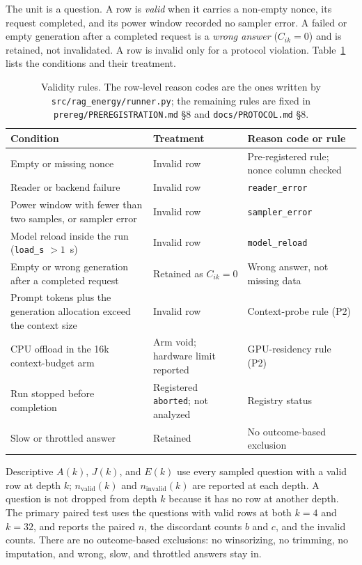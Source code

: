 \documentclass[a4paper,fleqn]{cas-sc}
\begin{document}
The unit is a question. A row is \emph{valid} when it carries a non-empty nonce, its request
completed, and its power window recorded no sampler error. A failed or empty generation after a
completed request is a \emph{wrong answer} ($C_{ik}=0$) and is retained, not invalidated. A row
is invalid only for a protocol violation. Table~\ref{tab:validity} lists the conditions and their
treatment.

\begin{table}[pos=htbp]
  \centering
  \caption{Validity rules. The row-level reason codes are the ones written by
  \texttt{src/rag\_energy/runner.py}; the remaining rules are fixed in
  \texttt{prereg/PREREGISTRATION.md} \S8 and \texttt{docs/PROTOCOL.md} \S8.}
  \label{tab:validity}
  \small
  \begin{tabularx}{\textwidth}{>{\raggedright\arraybackslash}p{4.4cm}>{\raggedright\arraybackslash}p{2.6cm}>{\raggedright\arraybackslash}X}
    \toprule
    \textbf{Condition} & \textbf{Treatment} & \textbf{Reason code or rule} \\
    \midrule
    Empty or missing nonce & Invalid row & Pre-registered rule; nonce column checked \\
    Reader or backend failure & Invalid row & \texttt{reader\_error} \\
    Power window with fewer than two samples, or sampler error & Invalid row & \texttt{sampler\_error} \\
    Model reload inside the run (\texttt{load\_s} $>1$~s) & Invalid row & \texttt{model\_reload} \\
    Empty or wrong generation after a completed request & Retained as $C_{ik}=0$ & Wrong answer, not missing data \\
    Prompt tokens plus the generation allocation exceed the context size & Invalid row & Context-probe rule (P2) \\
    CPU offload in the 16k context-budget arm & Arm void; hardware limit reported & GPU-residency rule (P2) \\
    Run stopped before completion & Registered \texttt{aborted}; not analyzed & Registry status \\
    Slow or throttled answer & Retained & No outcome-based exclusion \\
    \bottomrule
  \end{tabularx}
\end{table}

Descriptive $A(k)$, $J(k)$, and $E(k)$ use every sampled question with a valid row at depth $k$;
$n_{\mathrm{valid}}(k)$ and $n_{\mathrm{invalid}}(k)$ are reported at each depth. A question is
not dropped from depth $k$ because it has no row at another depth. The primary paired test uses
the questions with valid rows at both $k=4$ and $k=32$, and reports the paired $n$, the
discordant counts $b$ and $c$, and the invalid counts. There are no outcome-based exclusions: no
winsorizing, no trimming, no imputation, and wrong, slow, and throttled answers stay in.
\end{document}
